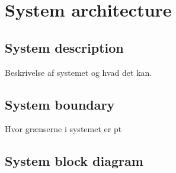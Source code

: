 \chapter{System architecture}

\section{System description}
Beskrivelse af systemet og hvad det kan.

\section{System boundary}
Hvor grænserne i systemet er pt

\section{System block diagram}
